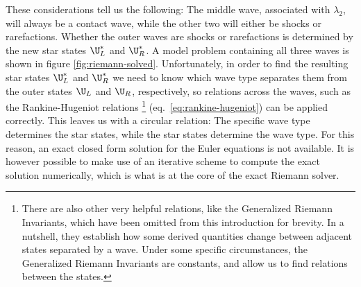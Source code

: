 These considerations tell us the following: The middle wave, associated with $\lambda_2$, will
always be a contact wave, while the other two will either be shocks or rarefactions. Whether the
outer waves are shocks or rarefactions is determined by the new star states $\U_L^*$ and $\U_R^*$.
A model problem containing all three waves is shown in figure \ref{fig:riemann-solved}.
Unfortunately, in order to find the resulting star states $\U_L^*$ and $\U_R^*$ we need to know
which wave type separates them from the outer states $\U_L$ and $\U_R$, respectively, so relations
across the waves, such as the Rankine-Hugeniot relations
\footnote{There are also other very helpful relations, like the Generalized Riemann Invariants,
which have been omitted from this introduction for brevity. In a nutshell, they establish how some
derived quantities change between adjacent states separated by a wave. Under some specific
circumstances, the Generalized Riemann Invariants are constants, and allow us to find relations
between the states.}
(eq.~\ref{eq:rankine-hugeniot}) can be applied correctly. This leaves us with a circular relation:
The specific wave type determines the star states, while the star states determine the wave type.
For this reason, an exact closed form solution for the Euler equations is not available. It is
however possible to make use of an iterative scheme to compute the exact solution numerically,
which is what is at the core of the exact Riemann solver.



